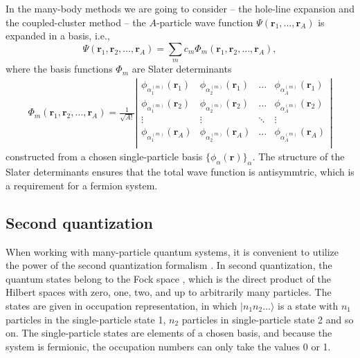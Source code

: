\documentclass[a4paper,12pt]{report}
\begin{document}
In the many-body methods we are going to consider -- the hole-line expansion and the coupled-cluster method -- the $A$-particle wave function $\Psi(\mathbf{r}_{1}, \dots , \mathbf{r}_{A})$ is expanded in a basis, i.e.,
\begin{equation} \label{eq:phi_expansion}
  \Psi(\mathbf{r}_{1}, \mathbf{r}_{2}, \dots , \mathbf{r}_{A}) = \sum_{m}c_{m}\Phi_{m}(\mathbf{r}_{1}, \mathbf{r}_{2}, \dots , \mathbf{r}_{A}), 
\end{equation}
where the basis functions $\Phi_{m}$ are Slater determinants
\begin{align}
  \Phi_{m}(\mathbf{r}_{1}, \mathbf{r}_{2}, \dots , \mathbf{r}_{A}) = \frac{1}{\sqrt{A!}}\left| \begin{array}{cccc}
    \phi_{\alpha_{1}^{(m)} }(\mathbf{r}_{1}) & \phi_{\alpha_{2}^{(m)} }(\mathbf{r}_{1}) & \ldots & \phi_{\alpha_{A}^{(m)} }(\mathbf{r}_{1}) \\
    \phi_{\alpha_{1}^{(m)} }(\mathbf{r}_{2}) & \phi_{\alpha_{2}^{(m)} }(\mathbf{r}_{2}) & \ldots & \phi_{\alpha_{A}^{(m)}}(\mathbf{r}_{2}) \\
    \vdots & \vdots & \ddots & \vdots \\
    \phi_{\alpha_{1}^{(m)} }(\mathbf{r}_{A}) & \phi_{\alpha_{2}^{(m)} }(\mathbf{r}_{A}) & \ldots & \phi_{\alpha_{A}^{(m)} }(\mathbf{r}_{A}) \\
  \end{array} \right| 
\end{align}
constructed from a chosen single-particle basis $\{\phi_{\alpha }(\mathbf{r})\}_{\alpha }$. The structure of the Slater determinants ensures that the total wave function is antisymmtric, which is a requirement for a fermion system. 
  

\subsection{Second quantization}

When working with many-particle quantum systems, it is convenient to utilize the power of the second quantization formalism \cite{fetter,bartlett_book,schwabl_adv}. In second quantization, the quantum states belong to the Fock space \cite{schwabl_adv}, which is the direct product of the Hilbert spaces \cite{kreyszig} with zero, one, two, and up to arbitrarily many particles. The states are given in occupation representation, in which $ |n_{1}n_{2}\dots \rangle $ is a state with $n_{1}$ particles in the single-particle state 1, $n_{2}$ particles in single-particle state 2 and so on. The single-particle states are elements of a chosen basis, and because the system is fermionic, the occupation numbers can only take the values 0 or 1.  
\end{document}
